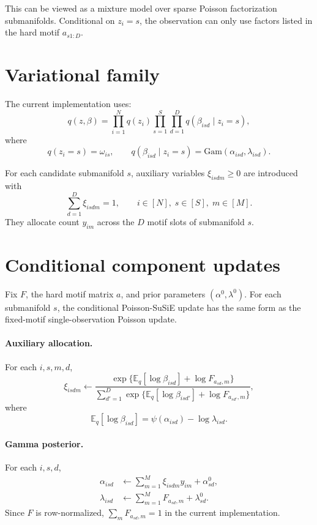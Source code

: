 \documentclass[11pt]{article}
\newcommand{\Gam}{\mathrm{Gam}}
\newcommand{\E}{\mathbb{E}}
\theoremstyle{definition}
\begin{document}
This can be viewed as a mixture model over sparse Poisson factorization
submanifolds. Conditional on $z_i=s$, the observation can only use factors
listed in the hard motif $a_{s1:D}$.

\section{Variational family}

The current implementation uses:
\[
  q(z,\beta) =
  \prod_{i=1}^{N} q(z_i)
  \prod_{s=1}^{S}\prod_{d=1}^{D}
  q(\beta_{isd} \mid z_i=s),
\]
where
\[
  q(z_i=s) = \omega_{is}, \qquad
  q(\beta_{isd} \mid z_i=s) = \Gam(\alpha_{isd}, \lambda_{isd}).
\]

For each candidate submanifold $s$, auxiliary variables
$\xi_{isdm} \geq 0$ are introduced with
\[
  \sum_{d=1}^{D} \xi_{isdm} = 1, \qquad i \in [N],\; s \in [S],\; m \in [M].
\]
They allocate count $y_{im}$ across the $D$ motif slots of submanifold $s$.

\section{Conditional component updates}

Fix $F$, the hard motif matrix $a$, and prior parameters
$(\alpha^0,\lambda^0)$. For each submanifold $s$, the conditional
Poisson-SuSiE update has the same form as the fixed-motif single-observation
Poisson update.

\paragraph{Auxiliary allocation.}
For each $i,s,m,d$,
\[
  \xi_{isdm}
  \leftarrow
  \frac{
    \exp\{\E_q[\log \beta_{isd}] + \log F_{a_{sd},m}\}
  }{
    \sum_{d'=1}^{D}
    \exp\{\E_q[\log \beta_{isd'}] + \log F_{a_{sd'},m}\}
  },
\]
where
\[
  \E_q[\log \beta_{isd}] = \psi(\alpha_{isd}) - \log \lambda_{isd}.
\]

\paragraph{Gamma posterior.}
For each $i,s,d$,
\begin{align}
  \alpha_{isd}
    &\leftarrow \sum_{m=1}^{M} \xi_{isdm} y_{im} + \alpha^0_{sd}, \\
  \lambda_{isd}
    &\leftarrow \sum_{m=1}^{M} F_{a_{sd},m} + \lambda^0_{sd}.
\end{align}
Since $F$ is row-normalized, $\sum_m F_{a_{sd},m}=1$ in the current
implementation.
\end{document}
